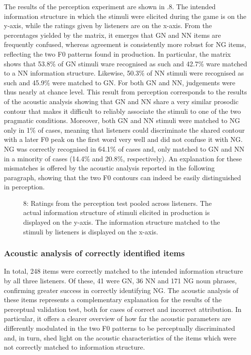 The results of the perception experiment are shown in .8. The intended information structure in which the stimuli were elicited during the game is on the y-axis, while the ratings given by listeners are on the x-axis. From the percentages yielded by the matrix, it emerges that GN and NN items are frequently confused, whereas agreement is consistently more robust for NG items, reflecting the two F0 patterns found in production. In particular, the matrix shows that 53.8\% of GN stimuli ware recognised as such and 42.7\% ware matched to a NN information structure. Likewise, 50.3\% of NN stimuli were recognised as such and 45.9\% were matched to GN. For both GN and NN, judgements were thus nearly at chance level. This result from perception corresponds to the results of the acoustic analysis showing that GN and NN share a very similar prosodic contour that makes it difficult to reliably associate the stimuli to one of the two pragmatic conditions. Moreover, both GN and NN stimuli were matched to NG only in 1\% of cases, meaning that listeners could discriminate the shared contour with a later F0 peak on the first word very well and did not confuse it with NG. NG was correctly recognised in 64.1\% of cases and, only matched to GN and NN in a minority of cases (14.4\% and 20.8\%, respectively). An explanation for these mismatches is offered by the acoustic analysis reported in the following paragraph, showing that the two F0 contours can indeed be easily distinguished in perception.

  
 

\begin{stylecaption}\begin{figure}
\caption{8: Ratings from the perception test pooled across listeners. The actual information structure of stimuli elicited in production is displayed on the y-axis. The information structure matched to the stimuli by listeners is displayed on the x-axis.} 
\label{fig:key:2}
\end{figure}\end{stylecaption}

\subsubsection{Acoustic analysis of correctly identified items}
\hypertarget{Toc191305903}{}
In total, 248 items were correctly matched to the intended information structure by all three listeners. Of these, 41 were GN, 36 NN and 171 NG noun phrases, confirming greater success in correctly identifying NG. The acoustic analysis of these items represents a complementary explanation for the results of the perceptual validation test, both for cases of correct and incorrect attribution. In particular, it offers a clearer overview of how far the acoustic parameters are differently modulated in the two F0 patterns to be perceptually discriminated and, in turn, shed light on the acoustic characteristics of the items which were not correctly matched to information structure.

